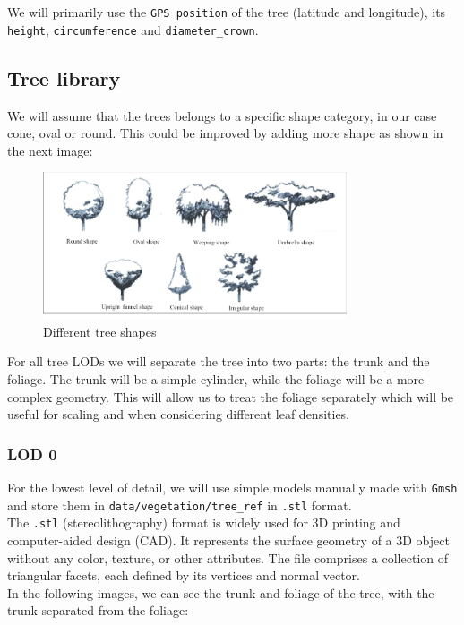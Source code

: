 \documentclass[12pt]{article}
\begin{document}
We will primarily use the \texttt{GPS position} of the tree (latitude and
longitude), its \texttt{height}, \texttt{circumference} and \texttt{diameter\_crown}.

\subsection{Tree library}
We will assume that the trees belongs to a specific shape category, in our case cone, oval or 
round. This could be improved by adding more shape as shown in the next image:
\begin{figure}[H]
    \centering
    \includegraphics[width=0.8\textwidth]{images/Different-types-of-the-trees-shape.png}
    \caption{Different tree shapes\cite{img:tree-shape}}
\end{figure}


For all tree LODs we will separate the tree into two parts: the trunk and the
foliage. The trunk will be a simple cylinder, while the foliage will be a more 
complex geometry. This will allow us to treat the foliage separately which will 
be useful for scaling and when considering different leaf densities.

\subsubsection{LOD 0}
For the lowest level of detail, we will use simple models manually made with 
\texttt{Gmsh}\cite{gmsh} and store them in \texttt{data/vegetation/tree\_ref} in \texttt{.stl} format.\\
The \texttt{.stl}\cite{stl} (stereolithography) format is widely used for 3D printing
and computer-aided design (CAD). It represents the surface geometry of a 3D
object without any color, texture, or other attributes. The file comprises a
collection of triangular facets, each defined by its vertices and normal vector.\\

In the following images, we can see the trunk and foliage of the tree, with the 
trunk separated from the foliage:
\end{document}
